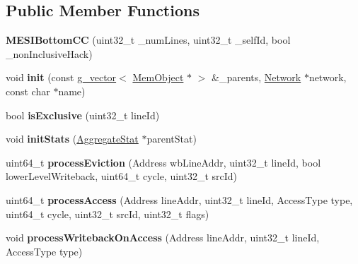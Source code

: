 \subsection*{Public Member Functions}
\begin{DoxyCompactItemize}
\item 
\hypertarget{classMESIBottomCC_aa28d6e141e8e31979f831a04a1c0e284}{{\bfseries M\-E\-S\-I\-Bottom\-C\-C} (uint32\-\_\-t \-\_\-num\-Lines, uint32\-\_\-t \-\_\-self\-Id, bool \-\_\-non\-Inclusive\-Hack)}\label{classMESIBottomCC_aa28d6e141e8e31979f831a04a1c0e284}

\item 
\hypertarget{classMESIBottomCC_a98a9b5ff311ca61f7af33b68f1f25a64}{void {\bfseries init} (const \hyperlink{classg__vector}{g\-\_\-vector}$<$ \hyperlink{classMemObject}{Mem\-Object} $\ast$ $>$ \&\-\_\-parents, \hyperlink{classNetwork}{Network} $\ast$network, const char $\ast$name)}\label{classMESIBottomCC_a98a9b5ff311ca61f7af33b68f1f25a64}

\item 
\hypertarget{classMESIBottomCC_ae35ac6f1be8b2afdf0b2bec49aef3d16}{bool {\bfseries is\-Exclusive} (uint32\-\_\-t line\-Id)}\label{classMESIBottomCC_ae35ac6f1be8b2afdf0b2bec49aef3d16}

\item 
\hypertarget{classMESIBottomCC_ab97d17c60463a4f917beefb776310f4a}{void {\bfseries init\-Stats} (\hyperlink{classAggregateStat}{Aggregate\-Stat} $\ast$parent\-Stat)}\label{classMESIBottomCC_ab97d17c60463a4f917beefb776310f4a}

\item 
\hypertarget{classMESIBottomCC_a7dc49733453e94f27a5b6980dae9ee32}{uint64\-\_\-t {\bfseries process\-Eviction} (Address wb\-Line\-Addr, uint32\-\_\-t line\-Id, bool lower\-Level\-Writeback, uint64\-\_\-t cycle, uint32\-\_\-t src\-Id)}\label{classMESIBottomCC_a7dc49733453e94f27a5b6980dae9ee32}

\item 
\hypertarget{classMESIBottomCC_af5b441412de0c68edc20b96a1578f81d}{uint64\-\_\-t {\bfseries process\-Access} (Address line\-Addr, uint32\-\_\-t line\-Id, Access\-Type type, uint64\-\_\-t cycle, uint32\-\_\-t src\-Id, uint32\-\_\-t flags)}\label{classMESIBottomCC_af5b441412de0c68edc20b96a1578f81d}

\item 
\hypertarget{classMESIBottomCC_a79fa9cb767d5aff31fabf2c0c9b698a3}{void {\bfseries process\-Writeback\-On\-Access} (Address line\-Addr, uint32\-\_\-t line\-Id, Access\-Type type)}\label{classMESIBottomCC_a79fa9cb767d5aff31fabf2c0c9b698a3}


\end{DoxyCompactItemize}
